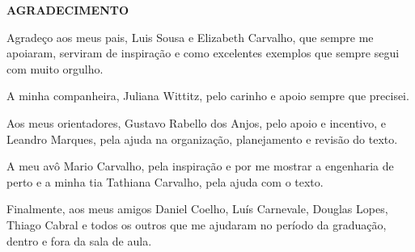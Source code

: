 \begin{center}
\textbf{AGRADECIMENTO}
\end{center}

Agradeço aos meus pais, Luis Sousa e Elizabeth Carvalho, que sempre me apoiaram, serviram de inspiração e como excelentes exemplos que sempre segui com muito orgulho.

A minha companheira, Juliana Wittitz, pelo carinho e apoio sempre que precisei.

Aos meus orientadores, Gustavo Rabello dos Anjos, pelo apoio e incentivo, e Leandro Marques, pela ajuda na organização, planejamento e revisão do texto.

A meu avô Mario Carvalho, pela inspiração e por me mostrar a engenharia de perto e a minha tia Tathiana Carvalho, pela ajuda com o texto.

Finalmente, aos meus amigos Daniel Coelho, Luís Carnevale, Douglas Lopes, Thiago Cabral e todos os outros que me ajudaram no período da graduação, dentro e fora da sala de aula.